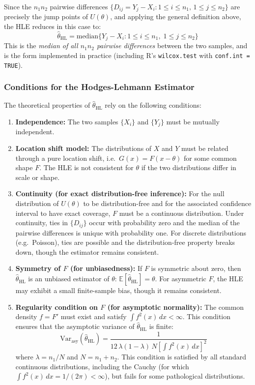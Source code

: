 \documentclass[10pt]{article}
\begin{document}
Since the $n_1 n_2$ pairwise differences $\{D_{ij} = Y_j - X_i : 1 \leq i \leq n_1,\, 1 \leq j \leq n_2\}$ are precisely the jump points of $U(\theta)$, and applying the general definition above, the HLE reduces in this case to:
\[
\boxed{\widehat{\theta}_{\mathrm{HL}} = \mathrm{median}\{Y_j - X_i : 1 \leq i \leq n_1,\; 1 \leq j \leq n_2\}}
\]
This is the \textit{median of all $n_1 n_2$ pairwise differences} between the two samples, and is the form implemented in practice (including R's \texttt{wilcox.test} with \texttt{conf.int = TRUE}).

\subsubsection{Conditions for the Hodges-Lehmann Estimator}

The theoretical properties of $\widehat{\theta}_{\mathrm{HL}}$ rely on the following conditions:

\begin{enumerate}
    \item \textbf{Independence:} The two samples $\{X_i\}$ and $\{Y_j\}$ must be mutually independent.

    \item \textbf{Location shift model:} The distributions of $X$ and $Y$ must be related through a pure location shift, i.e.\ $G(x) = F(x - \theta)$ for some common shape $F$. The HLE is not consistent for $\theta$ if the two distributions differ in scale or shape.

    \item \textbf{Continuity (for exact distribution-free inference):} For the null distribution of $U(\theta)$ to be distribution-free and for the associated confidence interval to have exact coverage, $F$ must be a continuous distribution. Under continuity, ties in $\{D_{ij}\}$ occur with probability zero and the median of the pairwise differences is unique with probability one. For discrete distributions (e.g.\ Poisson), ties are possible and the distribution-free property breaks down, though the estimator remains consistent.

    \item \textbf{Symmetry of $F$ (for unbiasedness):} If $F$ is symmetric about zero, then $\widehat{\theta}_{\mathrm{HL}}$ is an unbiased estimator of $\theta$: $\mathbb{E}[\widehat{\theta}_{\mathrm{HL}}] = \theta$. For asymmetric $F$, the HLE may exhibit a small finite-sample bias, though it remains consistent.

    \item \textbf{Regularity condition on $F$ (for asymptotic normality):} The common density $f = F'$ must exist and satisfy $\int f^2(x)\,dx < \infty$. This condition ensures that the asymptotic variance of $\widehat{\theta}_{\mathrm{HL}}$ is finite:
    \[
    \mathrm{Var}_{\mathrm{asy}}\!\left(\widehat{\theta}_{\mathrm{HL}}\right) = \frac{1}{12\,\lambda(1-\lambda)\,N\left[\int f^2(x)\,dx\right]^2}
    \]
    where $\lambda = n_1/N$ and $N = n_1 + n_2$. This condition is satisfied by all standard continuous distributions, including the Cauchy (for which $\int f^2(x)\,dx = 1/(2\pi) < \infty$), but fails for some pathological distributions.
\end{enumerate}
\end{document}
